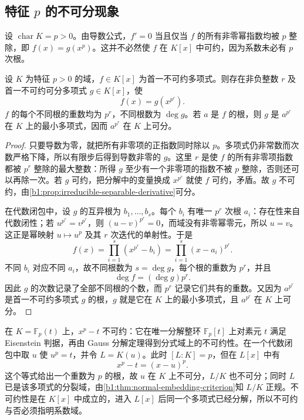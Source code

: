 \subsection{特征 \texorpdfstring{\(p\)}{p} 的不可分现象}
\label{b1:subsec:1601:03}

设 \(\operatorname{char}K=p>0\)。由导数公式，\(f'=0\) 当且仅当 \(f\) 的所有非零幂指数均被 \(p\) 整除，即 \(f(x)=g(x^p)\)。这并不必然使 \(f\) 在 \(K[x]\) 中可约，因为系数未必有 \(p\) 次根。

\begin{proposition}\label{b1:prop:inseparable-polynomial-shape}
	设 \(K\) 为特征 \(p>0\) 的域，\(f\in K[x]\) 为首一不可约多项式。则存在非负整数 \(r\) 及首一不可约可分多项式 \(g\in K[x]\)，使
	\[
		f(x)=g(x^{p^r}).
	\]
	\(f\) 的每个不同根的重数均为 \(p^r\)，不同根数为 \(\deg g\)。若 \(a\) 是 \(f\) 的根，则 \(g\) 是 \(a^{p^r}\) 在 \(K\) 上的最小多项式，因而 \(a^{p^r}\) 在 \(K\) 上可分。
\end{proposition}
\begin{proof}
	只要导数为零，就把所有非零项的正指数同时除以 \(p\)。多项式仍非常数而次数严格下降，所以有限步后得到导数非零的 \(g\)。这里 \(r\) 是使 \(f\) 的所有非零项指数都被 \(p^r\) 整除的最大整数：所得 \(g\) 至少有一个非零项的指数不被 \(p\) 整除，否则还可以再除一次。若 \(g\) 可约，把分解中的变量换成 \(x^{p^r}\) 就使 \(f\) 可约，矛盾。故 \(g\) 不可约，由\cref{b1:prop:irreducible-separable-derivative}可分。

	在代数闭包中，设 \(g\) 的互异根为 \(b_1,\ldots,b_s\)。每个 \(b_i\) 有唯一 \(p^r\) 次根 \(a_i\)：存在性来自代数闭性；若 \(u^{p^r}=v^{p^r}\)，则 \((u-v)^{p^r}=0\)，而域没有非零幂零元，所以 \(u=v\)。这正是幂映射 \(u\mapsto u^p\) 及其 \(r\) 次迭代的单射性。于是
	\[
		f(x)=\prod_{i=1}^s(x^{p^r}-b_i)=\prod_{i=1}^s(x-a_i)^{p^r}.
	\]
	不同 \(b_i\) 对应不同 \(a_i\)，故不同根数为 \(s=\deg g\)，每个根的重数为 \(p^r\)，并且
	\[
		\deg f=(\deg g)p^r.
	\]
	因此 \(g\) 的次数记录了全部不同根的个数，而 \(p^r\) 记录它们共有的重数。又因为 \(a^{p^r}\) 是首一不可约多项式 \(g\) 的根，\(g\) 就是它在 \(K\) 上的最小多项式，且 \(a^{p^r}\) 在 \(K\) 上可分。
\end{proof}
在 \(K=\mathbb F_p(t)\) 上，\(x^p-t\) 不可约：它在唯一分解整环 \(\mathbb F_p[t]\) 上对素元 \(t\) 满足 Eisenstein 判据，再由 Gauss 分解定理得到分式域上的不可约性。在一个代数闭包中取 \(u\) 使 \(u^p=t\)，并令 \(L=K(u)\)。此时 \([L:K]=p\)，但在 \(L[x]\) 中有
\[
	x^p-t=(x-u)^p.
\]
这个等式给出一个重数为 \(p\) 的根，故 \(u\) 在 \(K\) 上不可分，\(L/K\) 也不可分；同时 \(L\) 已是该多项式的分裂域，由\cref{b1:thm:normal-embedding-criterion}知 \(L/K\) 正规。不可约性是在 \(K[x]\) 中成立的，进入 \(L[x]\) 后同一个多项式已经分解，所以不可约与否必须指明系数域。

